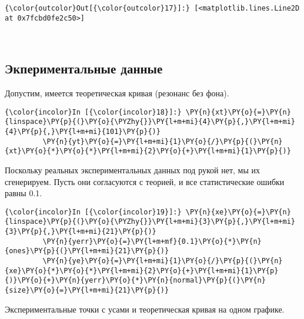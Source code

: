             \begin{Verbatim}[commandchars=\\\{\}]
{\color{outcolor}Out[{\color{outcolor}17}]:} [<matplotlib.lines.Line2D at 0x7fcbd0fe2c50>]
\end{Verbatim}
        
    \begin{center}
    \end{center}
    { \hspace*{\fill} \\}
    
\subsection{Экпериментальные данные}
\label{matplotlib4}

Допустим, имеется теоретическая кривая (резонанс без фона).

    \begin{Verbatim}[commandchars=\\\{\}]
{\color{incolor}In [{\color{incolor}18}]:} \PY{n}{xt}\PY{o}{=}\PY{n}{linspace}\PY{p}{(}\PY{o}{\PYZhy{}}\PY{l+m+mi}{4}\PY{p}{,}\PY{l+m+mi}{4}\PY{p}{,}\PY{l+m+mi}{101}\PY{p}{)}
         \PY{n}{yt}\PY{o}{=}\PY{l+m+mi}{1}\PY{o}{/}\PY{p}{(}\PY{n}{xt}\PY{o}{*}\PY{o}{*}\PY{l+m+mi}{2}\PY{o}{+}\PY{l+m+mi}{1}\PY{p}{)}
\end{Verbatim}

    Поскольку реальных экспериментальных данных под рукой нет, мы их
сгенерируем. Пусть они согласуются с теорией, и все статистические
ошибки равны 0.1.

    \begin{Verbatim}[commandchars=\\\{\}]
{\color{incolor}In [{\color{incolor}19}]:} \PY{n}{xe}\PY{o}{=}\PY{n}{linspace}\PY{p}{(}\PY{o}{\PYZhy{}}\PY{l+m+mi}{3}\PY{p}{,}\PY{l+m+mi}{3}\PY{p}{,}\PY{l+m+mi}{21}\PY{p}{)}
         \PY{n}{yerr}\PY{o}{=}\PY{l+m+mf}{0.1}\PY{o}{*}\PY{n}{ones}\PY{p}{(}\PY{l+m+mi}{21}\PY{p}{)}
         \PY{n}{ye}\PY{o}{=}\PY{l+m+mi}{1}\PY{o}{/}\PY{p}{(}\PY{n}{xe}\PY{o}{*}\PY{o}{*}\PY{l+m+mi}{2}\PY{o}{+}\PY{l+m+mi}{1}\PY{p}{)}\PY{o}{+}\PY{n}{yerr}\PY{o}{*}\PY{n}{normal}\PY{p}{(}\PY{n}{size}\PY{o}{=}\PY{l+m+mi}{21}\PY{p}{)}
\end{Verbatim}

    Экспериментальные точки с усами и теоретическая кривая на одном графике.

